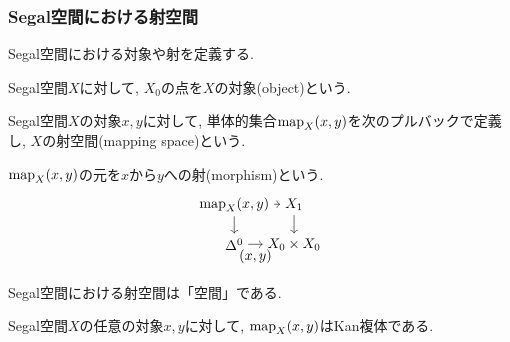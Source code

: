 \documentclass[aspectratio=169, dvipdfmx, 8pt, notheorems, uplatex]{beamer}
\begin{document}
\begin{frame}
  \frametitle{Segal空間における射空間}

  Segal空間における対象や射を定義する. 

  \begin{definition}[対象]
    Segal空間$X$に対して, $X_0$の点を$X$の対象(object)という. 
  \end{definition}

  \begin{definition}[射空間]
    Segal空間$X$の対象$x,y$に対して, 単体的集合$\mathrm{map}_X(x,y)$を次のプルバックで定義し, $X$の射空間(mapping space)という. 

    $\mathrm{map}_X(x,y)$の元を$x$から$y$への射(morphism)という. 
    \[
    \begin{tikzpicture}[->]
      \node (downleft) at (0,0) {$\Delta^0$};
      \node (downright) at (1.5,0) {$X_0 \times X_0$};
      \node (upleft) at (0,1) {$\map_X(x,y)$};
      \node (upright) at (1.5,1) {$X_1$};
      \draw (downleft) -- node[below] {$(x,y)$} (downright);
      \draw (upleft) -- (downleft);
      \draw (upleft) -- (upright);
      \draw (upright) -- (downright);
    \end{tikzpicture}  
    \]
  \end{definition}

  Segal空間における射空間は「空間」である. 

  \begin{remark}
    Segal空間$X$の任意の対象$x,y$に対して, $\mathrm{map}_X(x,y)$はKan複体である. 
  \end{remark}

\end{frame}
\end{document}
